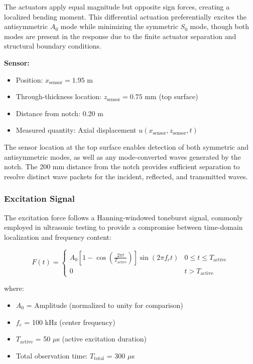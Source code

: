 \documentclass[12pt,a4paper]{report}
\begin{document}
The actuators apply equal magnitude but opposite sign forces, creating a localized bending moment. This differential actuation preferentially excites the antisymmetric $A_0$ mode while minimizing the symmetric $S_0$ mode, though both modes are present in the response due to the finite actuator separation and structural boundary conditions.

\textbf{Sensor:}
\begin{itemize}
    \item Position: $x_{\text{sensor}} = 1.95$ m
    \item Through-thickness location: $z_{\text{sensor}} = 0.75$ mm (top surface)
    \item Distance from notch: 0.20 m
    \item Measured quantity: Axial displacement $u(x_{\text{sensor}}, z_{\text{sensor}}, t)$
\end{itemize}

The sensor location at the top surface enables detection of both symmetric and antisymmetric modes, as well as any mode-converted waves generated by the notch. The 200 mm distance from the notch provides sufficient separation to resolve distinct wave packets for the incident, reflected, and transmitted waves.

\subsubsection{Excitation Signal}

The excitation force follows a Hanning-windowed toneburst signal, commonly employed in ultrasonic testing to provide a compromise between time-domain localization and frequency content:

\begin{equation}
F(t) = \begin{cases}
A_0 \left[1 - \cos\left(\frac{2\pi t}{T_{\text{active}}}\right)\right] \sin(2\pi f_c t) & 0 \leq t \leq T_{\text{active}} \\
0 & t > T_{\text{active}}
\end{cases}
\end{equation}

where:
\begin{itemize}
    \item $A_0$ = Amplitude (normalized to unity for comparison)
    \item $f_c$ = 100 kHz (center frequency)
    \item $T_{\text{active}}$ = 50 $\mu$s (active excitation duration)
    \item Total observation time: $T_{\text{total}}$ = 300 $\mu$s
\end{itemize}
\end{document}
